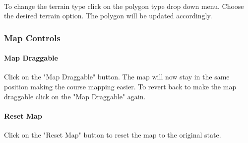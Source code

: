 \documentclass{article}
\begin{document}
    \paragraph{}
    To change the terrain type click on the polygon type drop down menu. Choose the desired terrain option. The polygon will be updated accordingly.
    
    \subsubsection{Map Controls}
    
    \paragraph{Map Draggable}
    Click on the "Map Draggable" button. The map will now stay in the same position making the course mapping easier. To revert back to make the map draggable click on the "Map Draggable" again.
    \paragraph{Reset Map}
    Click on the "Reset Map" button to reset the map to the original state.
\end{document}
